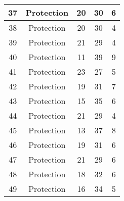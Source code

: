 \documentclass[results.tex]{subfiles}
\begin{document}
\begin{center}
\begin{tabular}{| c || c | c | c | c |}
            \hline
            37                      & Protection                   & 20                     & 30                      & 6                    \\
            \hline
            38                      & Protection                   & 20                     & 30                      & 4                    \\
            \hline
            39                      & Protection                   & 21                     & 29                      & 4                    \\
            \hline
            40                      & Protection                   & 11                     & 39                      & 9                    \\
            \hline
            41                      & Protection                   & 23                     & 27                      & 5                    \\
            \hline
            42                      & Protection                   & 19                     & 31                      & 7                    \\
            \hline
            43                      & Protection                   & 15                     & 35                      & 6                    \\
            \hline
            44                      & Protection                   & 21                     & 29                      & 4                    \\
            \hline
            45                      & Protection                   & 13                     & 37                      & 8                    \\
            \hline
            46                      & Protection                   & 19                     & 31                      & 6                    \\
            \hline
            47                      & Protection                   & 21                     & 29                      & 6                    \\
            \hline
            48                      & Protection                   & 18                     & 32                      & 6                    \\
            \hline
            49                      & Protection                   & 16                     & 34                      & 5                    \\
            \hline
        \end{tabular}
    \end{center}
\end{document}
